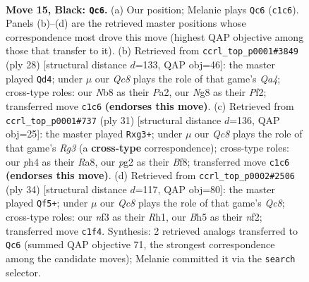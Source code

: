 \documentclass[11pt]{article}
\begin{document}
\clearpage

\begin{figure}[p]\centering
\begin{subfigure}{0.46\textwidth}\centering
\resizebox{\linewidth}{!}{%
\newchessgame
\chessboard[
  setfen={rn2k1nr/1Q3ppp/p7/4P2b/7P/1P3N2/P3BKP1/RNq4R b kq - 2 15},
  showmover=false,
  pgfstyle=straightmove, color=movearrow, markmove={c1-c6}
]}
\caption{}
\end{subfigure}\hfill
\begin{subfigure}{0.46\textwidth}\centering
\resizebox{\linewidth}{!}{%
\newchessgame
\chessboard[
  setfen={rnb2rk1/pp2pp1p/6p1/4P3/Q7/3R2P1/Pq2PPBP/RN4K1 w - - 0 15},
  showmover=false,
  pgfstyle=straightmove, color=movearrow, markmove={a4-d4}
]}
\caption{}
\end{subfigure}
\\[4pt]
\begin{subfigure}{0.46\textwidth}\centering
\resizebox{\linewidth}{!}{%
\newchessgame
\chessboard[
  setfen={r3kb2/1pQ2p1p/p4Br1/4p3/4P3/2P3Pq/PP3P2/RN3RK1 b q - 0 16},
  showmover=false,
  pgfstyle=straightmove, color=movearrow, markmove={g6-g3}
]}
\caption{}
\end{subfigure}\hfill
\begin{subfigure}{0.46\textwidth}\centering
\resizebox{\linewidth}{!}{%
\newchessgame
\chessboard[
  setfen={rnQ4r/5kpp/pp6/2b1P1B1/3q4/P1N2P2/1P3n1P/R3K2R w KQ - 6 18},
  showmover=false,
  pgfstyle=straightmove, color=movearrow, markmove={c8-f5}
]}
\caption{}
\end{subfigure}
\caption{\textbf{Move 15, Black: \texttt{Qc6}.} (a) Our position; Melanie plays \texttt{Qc6} (\texttt{c1c6}). Panels (b)--(d) are the retrieved master positions whose correspondence most drove this move (highest QAP objective among those that transfer to it). (b) Retrieved from \texttt{ccrl\_top\_p0001\#3849} (ply 28) [structural distance $d$=133, QAP obj=46]: the master played \texttt{Qd4}; under $\mu$ our \emph{Qc8} plays the role of that game's \emph{Qa4}; cross-type roles: our \emph{N}b8 as their \emph{P}a2, our \emph{N}g8 as their \emph{P}f2; transferred move \texttt{c1c6} \textbf{(endorses this move)}. (c) Retrieved from \texttt{ccrl\_top\_p0001\#737} (ply 31) [structural distance $d$=136, QAP obj=25]: the master played \texttt{Rxg3+}; under $\mu$ our \emph{Qc8} plays the role of that game's \emph{Rg3} (a \textbf{cross-type} correspondence); cross-type roles: our \emph{p}h4 as their \emph{R}a8, our \emph{p}g2 as their \emph{B}f8; transferred move \texttt{c1c6} \textbf{(endorses this move)}. (d) Retrieved from \texttt{ccrl\_top\_p0002\#2506} (ply 34) [structural distance $d$=117, QAP obj=80]: the master played \texttt{Qf5+}; under $\mu$ our \emph{Qc8} plays the role of that game's \emph{Qc8}; cross-type roles: our \emph{n}f3 as their \emph{R}h1, our \emph{B}h5 as their \emph{n}f2; transferred move \texttt{c1f4}. Synthesis: 2 retrieved analogs transferred to \texttt{Qc6} (summed QAP objective 71, the strongest correspondence among the candidate moves); Melanie committed it via the \texttt{search} selector.}
\label{fig:thought-m29}
\end{figure}
\end{document}
